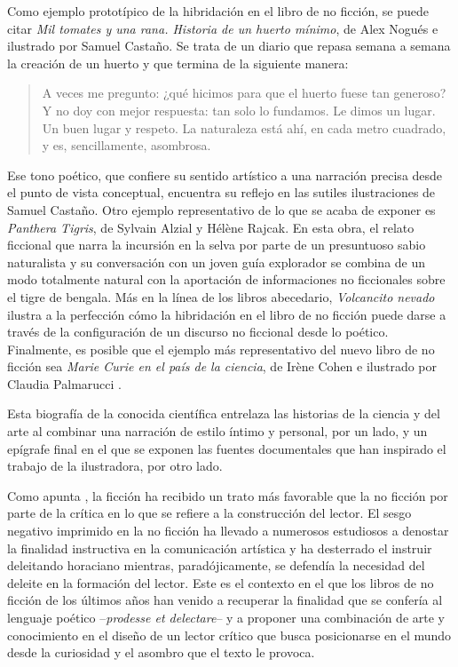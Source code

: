 \documentclass[spanish]{textolivre}
\begin{document}
Como ejemplo prototípico de la hibridación en el libro de no ficción, se puede citar \textit{Mil tomates y una rana. Historia de un huerto mínimo}, de Alex Nogués e ilustrado por Samuel Castaño. Se trata de un diario que repasa semana a semana la creación de un huerto y que termina de la siguiente manera:

\begin{quote}
    A veces me pregunto: ¿qué hicimos para que el huerto fuese tan generoso? Y no doy con mejor respuesta: tan solo lo fundamos. Le dimos un lugar. Un buen lugar y respeto. La naturaleza está ahí, en cada metro cuadrado, y es, sencillamente, asombrosa.
\end{quote}

Ese tono poético, que confiere su sentido artístico a una narración precisa desde el punto de vista conceptual, encuentra su reflejo en las sutiles ilustraciones de Samuel Castaño. Otro ejemplo representativo de lo que se acaba de exponer es \textit{Panthera Tigris}, de Sylvain Alzial y Hélène Rajcak. En esta obra, el relato ficcional que narra la incursión en la selva por parte de un presuntuoso sabio naturalista y su conversación con un joven guía explorador se combina de un modo totalmente natural con la aportación de informaciones no ficcionales sobre el tigre de bengala. Más en la línea de los libros abecedario, \textit{Volcancito nevado} ilustra a la perfección cómo la hibridación en el libro de no ficción puede darse a través de la configuración de un discurso no ficcional desde lo poético. Finalmente, es posible que el ejemplo más representativo del nuevo libro de no ficción sea \textit{Marie Curie en el país de la ciencia}, de Irène Cohen e ilustrado por Claudia Palmarucci \cite{tabernero__2022}.

Esta biografía de la conocida científica entrelaza las historias de la ciencia y del arte al combinar una narración de estilo íntimo y personal, por un lado, y un epígrafe final en el que se exponen las fuentes documentales que han inspirado el trabajo de la ilustradora, por otro lado.

Como apunta \textcite{von-merveldt_informational_2018}, la ficción ha recibido un trato más favorable que la no ficción por parte de la crítica en lo que se refiere a la construcción del lector. El sesgo negativo imprimido en la no ficción ha llevado a numerosos estudiosos a denostar la finalidad instructiva en la comunicación artística y ha desterrado el instruir deleitando horaciano mientras, paradójicamente, se defendía la necesidad del deleite en la formación del lector. Este es el contexto en el que los libros de no ficción de los últimos años han venido a recuperar la finalidad que se confería al lenguaje poético --\textit{prodesse et delectare}-- y a proponer una combinación de arte y conocimiento en el diseño de un lector crítico que busca posicionarse en el mundo desde la curiosidad y el asombro que el texto le provoca.
\end{document}
